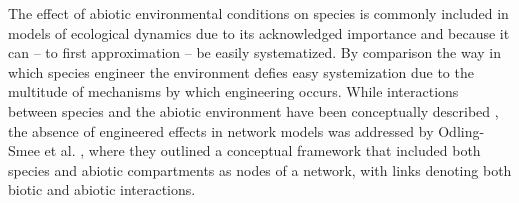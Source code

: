 \documentclass[twocolumn,preprintnumbers,amsmath,amssymb,superscriptaddress,linenumbers]{revtex4-1}
\begin{document}
The effect of abiotic environmental conditions on species is commonly included in models of ecological dynamics \cite{Woodward2010,Brose2012,Gibert2019b} due to its acknowledged importance and because it can -- to first approximation -- be easily systematized. 
By comparison the way in which species engineer the environment defies easy systemization due to the multitude of mechanisms by which engineering occurs.
While interactions between species and the abiotic environment have been conceptually described \cite{Olff2009,Getz2011}, the absence of engineered effects in network models was addressed by Odling-Smee et al. \cite{OdlingSmee2013}, where they outlined a conceptual framework that included both species and abiotic compartments as nodes of a network, with links denoting both biotic and abiotic interactions.

\end{document}
